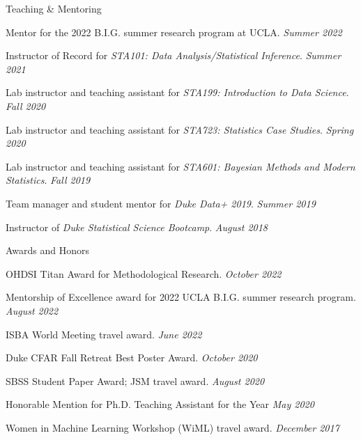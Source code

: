 \documentclass{resume} %
\begin{document}
\begin{rSection}{Teaching \& Mentoring}

Mentor for the 2022 B.I.G. summer research program at UCLA.  \hfill {\em Summer 2022}

Instructor of Record for \emph{STA101: Data Analysis/Statistical Inference}. \hfill {\em Summer 2021}

Lab instructor and teaching assistant for \emph{STA199: Introduction to Data Science}. \hfill {\em Fall 2020}


Lab instructor and teaching assistant for \emph{STA723: Statistics Case Studies}. \hfill {\em Spring 2020}


Lab instructor and teaching assistant for \emph{STA601: Bayesian Methods and Modern Statistics}. \hfill {\em Fall 2019}


Team manager and student mentor for \emph{Duke Data+ 2019}. \hfill {\em Summer 2019}

Instructor of \emph{Duke Statistical Science Bootcamp}. \hfill {\em August 2018}
\end{rSection}


\begin{rSection}{Awards and Honors}

OHDSI Titan Award for Methodological Research. 
\hfill {\em October 2022}

Mentorship of Excellence award for 2022 UCLA B.I.G. summer research program. \hfill {\em August 2022}

ISBA World Meeting travel award.
\hfill {\em June 2022}

Duke CFAR Fall Retreat Best Poster Award. 
\hfill {\em October 2020}

SBSS Student Paper Award; JSM travel award. \hfill {\em August 2020}

Honorable Mention for Ph.D. Teaching Assistant for the Year
\hfill {\em May 2020}

Women in Machine Learning Workshop (WiML) travel award. \hfill {\em December 2017}

\end{rSection}
\end{document}

